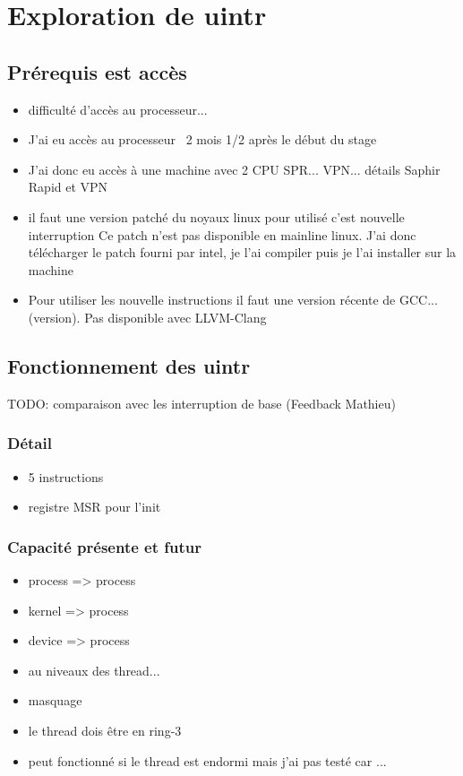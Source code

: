 \section{Exploration de uintr}

\subsection{Prérequis est accès}

\begin{itemize}
  \item difficulté d'accès au processeur...
  \item J'ai eu accès au processeur ~2 mois 1/2 après le début du stage
  \item J'ai donc eu accès à une machine avec 2 CPU SPR... VPN... détails Saphir Rapid et VPN
  \item il faut une version patché du noyaux linux pour utilisé c'est nouvelle interruption
  Ce patch n'est pas disponible en mainline linux.
  J'ai donc télécharger le patch fourni par intel, je l'ai compiler puis je l'ai installer sur la machine
  \item Pour utiliser les nouvelle instructions il faut une version récente de GCC... (version).
  Pas disponible avec LLVM-Clang
\end{itemize}

\subsection{Fonctionnement des uintr}

TODO: comparaison avec les interruption de base (Feedback Mathieu)

\subsubsection{Détail}

\begin{itemize}
  \item 5 instructions
  \item registre MSR pour l'init
\end{itemize}

\subsubsection{Capacité présente et futur}

\begin{itemize}
  \item process => process
  \item kernel => process
  \item device => process
  \item au niveaux des thread...
  \item masquage
  \item le thread dois être en ring-3
  \item peut fonctionné si le thread est endormi mais j'ai pas testé car ...
\end{itemize}

